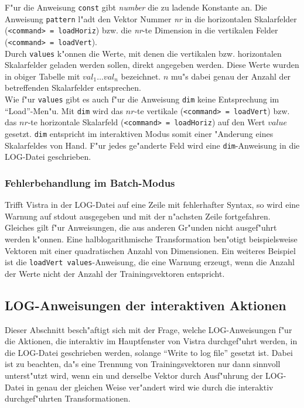F"ur die Anweisung {\tt const} gibt {\it number} die zu ladende Konstante an.
Die Anweisung {\tt pattern} l"adt den Vektor Nummer {\it nr}
in die horizontalen Skalarfelder ({\tt <command> = loadHoriz})
bzw. die {\it nr}-te Dimension in die vertikalen Felder 
({\tt <command> = loadVert}). \\
Durch {\tt values} k"onnen die Werte, mit denen die vertikalen bzw.
horizontalen Skalarfelder geladen werden sollen, direkt angegeben werden.
Diese Werte wurden in obiger Tabelle mit $val_1 \ldots val_n$ bezeichnet.
$n$ mu"s dabei genau der Anzahl der betreffenden Skalarfelder
entsprechen. \\
Wie f"ur {\tt values} gibt es auch f"ur die Anweisung {\tt dim} keine
Entsprechung im "`Load"'-Men"u.
Mit {\tt dim} wird das $nr$-te vertikale ({\tt <command> = loadVert})
bzw. das $nr$-te horizontale Skalarfeld ({\tt <command> = loadHoriz})
auf den Wert $value$ gesetzt.
{\tt dim} entspricht im interaktiven Modus somit einer "Anderung 
eines Skalarfeldes von Hand.
F"ur jedes ge"anderte Feld wird eine {\tt dim}-Anweisung in die LOG-Datei
geschrieben.   
 
\subsubsection*{Fehlerbehandlung im Batch-Modus}

Trifft Vistra in der LOG-Datei auf eine Zeile mit fehlerhafter Syntax,
so wird eine Warnung auf stdout ausgegeben und mit der 
n"achsten Zeile fortgefahren.
Gleiches gilt f"ur Anweisungen, die aus anderen Gr"unden 
nicht ausgef"uhrt werden k"onnen.
Eine halblogarithmische Transformation ben"otigt beispielsweise Vektoren
mit einer quadratischen Anzahl von Dimensionen.
Ein weiteres Beispiel ist die {\tt loadVert values}-Anweisung, die
eine Warnung erzeugt, wenn die Anzahl der Werte nicht der Anzahl
der Trainingsvektoren entspricht. 

\subsection{LOG-Anweisungen der interaktiven Aktionen}

Dieser Abschnitt besch"aftigt sich mit der Frage, welche LOG-Anweisungen
f"ur die Aktionen, die interaktiv im Hauptfenster von Vistra 
durchgef"uhrt werden, in die LOG-Datei geschrieben werden, solange 
"`Write to log file"' gesetzt ist.
Dabei ist zu beachten, da"s eine Trennung von Trainingsvektoren nur
dann sinnvoll unterst"utzt wird, wenn ein und derselbe Vektor durch
Ausf"uhrung der LOG-Datei in genau der gleichen Weise ver"andert wird wie 
durch die interaktiv durchgef"uhrten Transformationen.

